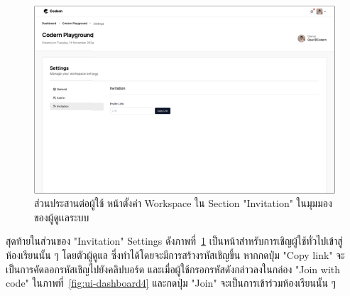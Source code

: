 \documentclass[12pt,oneside,openright,a4paper]{cpe-thai-project}
\begin{document}
    \hypertarget{ui-org-assign-settings3}{
        \begin{figure}[H]
        \centering
            \includegraphics[width=15cm]{figure/ui/ui-assign-settings3.png}
            \caption[ส่วนประสานต่อผู้ใช้ หน้าตั้งค่า Workspace ของผู้ดูเเลระบบ (3)]{ส่วนประสานต่อผู้ใช้ หน้าตั้งค่า Workspace ใน Section "Invitation" ในมุมมองของผู้ดูเเลระบบ}
            \label{fig:ui-org-assign-settings3}
        \end{figure}
    }
    \begin{flushleft}
    สุดท้ายในส่วนของ "Invitation" Settings ดังภาพที่~\ref{fig:ui-org-assign-settings3} เป็นหน้าสำหรับการเชิญผู้ใช้ทั่วไปเข้าสู่ห้องเรียนนั้น ๆ โดยตัวผู้ดูแล ซึ่งทำได้โดยจะมีการสร้างรหัสเชิญขึ้น หากกดปุ่ม "Copy link" จะเป็นการคัดลอกรหัสเชิญไปยังคลิปบอร์ด และเมื่อผู้ใช้กรอกรหัสดังกล่าวลงในกล่อง "Join with code" ในภาพที่~\ref{fig:ui-dashboard4} และกดปุ่ม "Join" จะเป็นการเข้าร่วมห้องเรียนนั้น ๆ 
    \end{flushleft}
\end{document}
